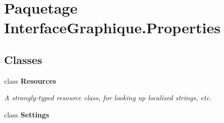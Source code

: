\hypertarget{namespace_interface_graphique_1_1_properties}{\section{Paquetage Interface\-Graphique.\-Properties}
\label{namespace_interface_graphique_1_1_properties}
}
\subsection*{Classes}
\begin{DoxyCompactItemize}
\item 
class {\bfseries Resources}
\begin{DoxyCompactList}\small\item\em A strongly-\/typed resource class, for looking up localized strings, etc. \end{DoxyCompactList}\item 
class {\bfseries Settings}
\end{DoxyCompactItemize}
